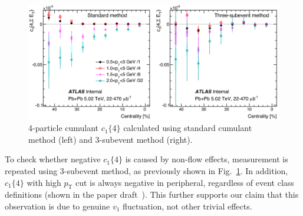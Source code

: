\begin{figure}[H]
\centering
\includegraphics[width=.8\linewidth]{figs/sec_result/forQM/mtd_c4_v1.png}
\caption{4-particle cumulant $c_1\{4\}$ calculated using standard cumulant method (left) and 3-subevent method (right).}
\label{fig:mtd_c4_v1}
\end{figure}
To check whether negative $c_1\{4\}$ is caused by non-flow effects, measurement is repeated using 3-subevent method, as previously shown in Fig.~\ref{fig:mtd_c4_v1}. In addition, $c_1\{4\}$ with high $p_\text{T}$ cut is always negative in peripheral, regardless of event class definitions (shown in the paper draft~\cite{Jia:2311860}). This further supports our claim that this observation is due to genuine $v_1$ fluctuation, not other trivial effects.

